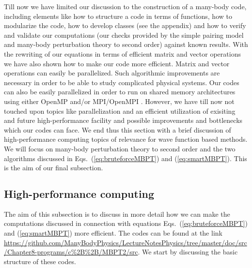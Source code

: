 Till now we have limited our discussion to the construction of a
many-body code, including elements like how to structure a code in
terms of functions, how to modularize the code, how to develop classes
(see the appendix) and how to verify and validate our computations
(our checks provided by the simple pairing model and many-body
perturbation theory to second order) against known results.  With the
rewriting of our equations in terms of efficient matrix and vector
operations we have also shown how to make our code more efficient.
Matrix and vector operations can easily be parallelized. Such
algorithmic improvements are necessary in order to be able to study
complicated physical systems.  Our codes can also be easily parallelized in order to run on shared memory architectures using either OpenMP \cite{openmp} and/or MPI/OpenMPI \cite{mpi,openmpi}.
However, we have till now not touched
upon topics like parallelization and an efficient utilization of exisiting and future
high-performance facility and possible improvements and bottlenecks which our codes can face. We end thus this section with a brief discussion
of high-performance computing topics of relevance for wave function based methods. We will focus on many-body perturbation theory to second order and the two algorithms discussed in Eqs.~(\ref{eq:bruteforceMBPT}) and (\ref{eq:smartMBPT}). This is the aim of our final subsection. 


\subsection{High-performance computing}
The aim of this subsection is to discuss in more detail how we can make the computations discussed in connection with equations 
Eqs.~(\ref{eq:bruteforceMBPT}) and (\ref{eq:smartMBPT}) more efficient. 
The codes can be found at the link \url{https://github.com/ManyBodyPhysics/LectureNotesPhysics/tree/master/doc/src/Chapter8-programs/c%2B%2B/MBPT2/src}.
We start by discussing the basic structure of these codes. 

